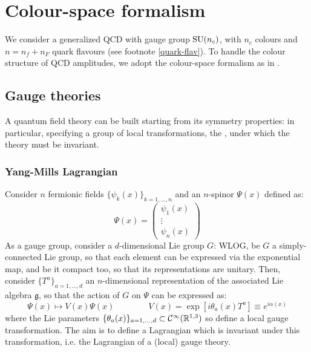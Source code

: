 \section{Colour-space formalism}
\label{sec:colour-space}

We consider a generalized QCD with gauge group $ \mathrm{SU}(n_c) $, with $ n_c $ colours and $ n = n_f + n_F $ quark flavours (see footnote \ref{quark-flav}). To handle the colour structure of QCD amplitudes, we adopt the colour-space formalism as in \cite{Catani-1997}.

\subsection{Gauge theories}
\label{ssec:gauge-th}

A quantum field theory can be built starting from its symmetry properties: in particular, specifying a group of local transformations, the , under which the theory must be invariant.

\subsubsection{Yang-Mills Lagrangian}

Consider $ n $ fermionic fields $ \{\psi_k(x)\}_{k = 1, \dots, n} $ and an $ n $-spinor $ \Psi(x) $ defined as:
\begin{equation}
  \Psi(x) =
  \begin{pmatrix}
    \psi_1(x) \\ \vdots \\ \psi_n(x)
  \end{pmatrix}
\end{equation}
As a gauge group, consider a $ d $-dimensional Lie group $ G $: WLOG, be $ G $ a simply-connected Lie group, so that each element can be expressed via the exponential map, and be it compact too, so that its representations are unitary. Then, consider $ \{T^a\}_{a = 1, \dots, d} $ an $ n $-dimensional representation of the associated Lie algebra $ \mathfrak{g} $, so that the action of $ G $ on $ \Psi $ can be expressed as:
\begin{equation}
  \Psi(x) \mapsto V(x) \Psi(x)
  \qquad \qquad
  V(x) = \exp \left[ i \theta_a(x) T^a \right] \equiv e^{i \alpha(x)}
  \label{eq:gauge-trans}
\end{equation}
where the Lie parameters $ \{\theta_a(x)\}_{a = 1, \dots, d} \subset \mathcal{C}^\infty(\mathbb{R}^{1,3}) $ so define a local gauge transformation. The aim is to define a Lagrangian which is invariant under this transformation, i.e. the Lagrangian of a (local) gauge theory.

